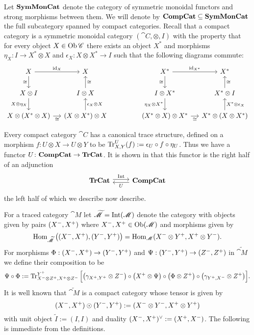 \documentclass[12pt,oneside,article,draft]{memoir}
\begin{document}
Let $\mathbf{SymMonCat}$ denote the category of symmetric monoidal functors and strong morphisms between them. We will denote by $\mathbf{CompCat}\subseteq\mathbf{SymMonCat}$ the full subcategory spanned by compact categories. Recall that a compact category is a symmetric monoidal category $(\cat{C},\otimes,I)$ with the property that for every object $X\in\operatorname{Ob}\mathscr{C}$ there exists an object $X^*$ and morphisms $\eta_X\colon I\to X^*\otimes X$ and $\epsilon_X\colon X\otimes X^*\to I$ such that the following diagrams commute:
$$\begin{tikzcd}[column sep=small]
X\arrow[r,"\id_X"]\arrow[d,"\cong"']&X\\
X\otimes I\arrow[d,"X\otimes\eta_X"']&I\otimes X\arrow[u,"\cong"']\\
X\otimes(X^*\otimes X)\arrow[r,"\cong"']&(X\otimes X^*)\otimes X\arrow[u,"\epsilon_X\otimes X"']
\end{tikzcd}
\hspace{.6in}
\begin{tikzcd}[column sep=small]
X^*\arrow[r,"\id_{X^*}"]\arrow[d,"\cong"']&X^*\\
I\otimes X^*\arrow[d,"\eta_X\otimes X^*"']&X^*\otimes I\arrow[u,"\cong"']\\
(X^*\otimes X)\otimes X^*\arrow[r,"\cong"']&X^*\otimes (X\otimes X^*)\arrow[u,"X^*\otimes\epsilon_X"']
\end{tikzcd}
$$

Every compact category $\cat{C}$ has a canonical trace structure, defined on a morphism $f\colon U\otimes X\to U\otimes Y$ to be $\operatorname{Tr}^U_{X,Y}(f):=\epsilon_U\circ f\circ \eta_U$. Thus we have a functor 
$U\colon\mathbf{CompCat}\to\mathbf{TrCat}$. It is shown in \cite{Joyal-Street-Verity} that this functor is the right half of an adjunction 
\begin{equation}\label{dia:traced compact adjunction}
\begin{tikzcd}
\TrCat\arrow[r,shift left=.5ex, "\Int"]&\CompCat\arrow[l,shift left=.5ex,"U"]
\end{tikzcd}
\end{equation}
the left half of which we describe now describe. 

For a traced category $\cat{M}$ let $\widetilde{\mathscr{M}}=\operatorname{Int}(\mathscr{M})$ denote the category with objects given by pairs $(X^-,X^+)$ where $X^-,X^+\in \operatorname{Ob}(\mathscr{M})$ and morphisms given by 
\[\operatorname{Hom}_{\widetilde{\mathscr{M}}}\big((X^-,X^+),(Y^-,Y^+)\big)=\operatorname{Hom}_{\mathscr{M}}(X^-\otimes Y^+,X^+\otimes Y^-).\]
For morphisms $\Phi:(X^-,X^+)\to(Y^-,Y^+)$ and $\Psi:(Y^-,Y^+)\to(Z^-,Z^+)$ in $\widetilde{\cat{M}}$ we define their composition to be
\[\Psi\circ\Phi:=\operatorname{Tr}^{Y^+}_{X^-\otimes Z^+,X^+\otimes Z^-}\Big[\big(\gamma_{X^+,Y^+}\otimes Z^-\big)\circ\big(X^+\otimes\Psi\big)\circ\big(\Phi\otimes Z^+\big)\circ\big(\gamma_{Y^+,X^-}\otimes Z^+\big)\Big].\]
It is well known that $\widetilde{\cat{M}}$ is a compact  category whose tensor is given by
\[(X^-,X^+)\odot(Y^-,Y^+):=(X^-\otimes Y^-,X^+\otimes Y^+)\]
with unit object $\tilde I:=(I,I)$ and duality $(X^-,X^+)^\vee:=(X^+,X^-)$.  The following is immediate from the definitions.
\end{document}

